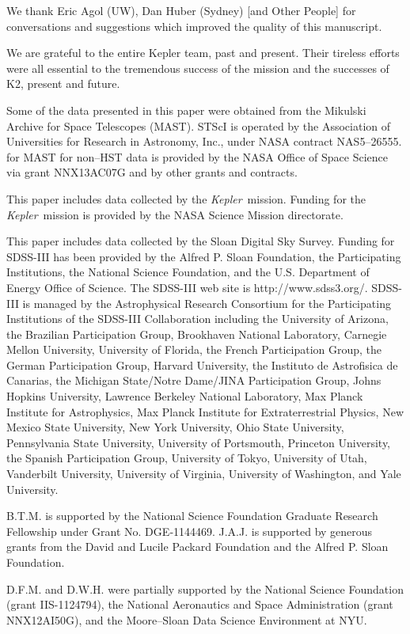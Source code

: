 \documentclass{emulateapj}
\newcommand{\project}[1]{\textsl{#1}}
\newcommand{\kep}{\project{Kepler}}
\begin{document}
\acknowledgements
We thank Eric Agol (UW), Dan Huber (Sydney) [and Other People] for conversations and
suggestions which improved the quality of this manuscript.


We are grateful to the entire Kepler team, past and present.
Their tireless efforts were all essential to the tremendous success of the mission and the
successes of K2, present and future.


Some of the data presented in this paper were obtained from the Mikulski
Archive for Space Telescopes (MAST).
STScI is operated by the Association of Universities for Research
in Astronomy, Inc., under NASA contract NAS5--26555.
for MAST for non--HST data is provided by the NASA Office of Space
Science via grant NNX13AC07G and by other grants and contracts.

This paper includes data collected by the \kep\ mission.
Funding for the \kep\ mission is provided by the NASA Science
Mission directorate.

This paper includes data collected by the Sloan Digital Sky Survey.
Funding for SDSS-III has been provided by the Alfred P. Sloan Foundation,
the Participating Institutions, the National Science Foundation, and the
U.S. Department of Energy Office of Science. The SDSS-III web site is
http://www.sdss3.org/.
SDSS-III is managed by the Astrophysical Research Consortium for the
Participating Institutions of the SDSS-III Collaboration including the
University of Arizona, the Brazilian Participation Group, Brookhaven
National Laboratory, Carnegie Mellon University, University of Florida,
the French Participation Group, the German Participation Group, Harvard
University, the Instituto de Astrofisica de Canarias, the Michigan
State/Notre Dame/JINA Participation Group, Johns Hopkins University,
Lawrence Berkeley National Laboratory, Max Planck Institute for
Astrophysics, Max Planck Institute for Extraterrestrial Physics, New
Mexico State University, New York University, Ohio State University,
Pennsylvania State University, University of Portsmouth, Princeton
University, the Spanish Participation Group, University of Tokyo,
University of Utah, Vanderbilt University, University of Virginia,
University of Washington, and Yale University.

B.T.M. is supported by the National Science Foundation Graduate Research
Fellowship under Grant No. DGE‐1144469.
J.A.J. is supported by generous grants from the David and Lucile Packard
Foundation and the Alfred P. Sloan Foundation.


D.F.M. and D.W.H. were partially supported by the National Science Foundation
(grant IIS-1124794), the National Aeronautics and Space Administration (grant
NNX12AI50G), and the Moore–Sloan Data Science Environment at NYU.
\end{document}
